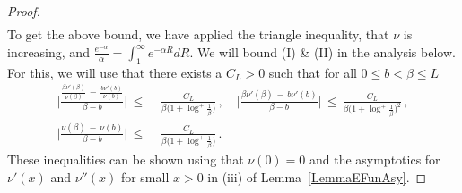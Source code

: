 \documentclass[10pt]{article}
\numberwithin{equation}{section}
\theoremstyle{definition}
\begin{document}
\begin{proof}
\begin{align}
\end{align}
To get the above bound, we have applied the triangle inequality, that $\nu$ is increasing, and $\frac{e^{-\alpha}}{\alpha} =\int_1^{\infty}e^{-\alpha R}dR $.  We will bound (I) \& (II) in the analysis below.  For this, we will use that there exists a $C_L>0$ such that  for all $ 0\leq  b<\beta \leq L$
\begin{align}\label{3Bounds}
  \Bigg|  \frac{\frac{\beta \nu'(\beta)}{ \nu(\beta)}\,-\,\frac{b \nu'(b)}{ \nu(b)}   }{\beta-b  }  \Bigg|  \,\leq \, &\,\frac{ C_L}{\beta\big(1+\log^+ \frac{1}{\beta}\big) }\,, \quad \bigg|\frac{ \beta \nu'(\beta)\,-\,   b\nu'(b)  }{\beta-b } \bigg| \,\leq \,\frac{ C_L}{\beta\big(1+\log^+ \frac{1}{\beta}\big)^2  }\,,   \\ \bigg| \frac{  \nu(\beta)\,-\,   \nu(b)  }{\beta-b } \bigg| \,\leq \,&\,\frac{ C_L}{\beta\big(1+\log^+ \frac{1}{\beta}\big)  } \,. \label{3BoundsRe}
\end{align}
These inequalities  can be shown using that $\nu(0)=0$   and the asymptotics for $\nu'(x)$ and $\nu''(x)$ for small $x>0$ in (iii) of Lemma~\ref{LemmaEFunAsy}.


\end{proof}
\end{document}
